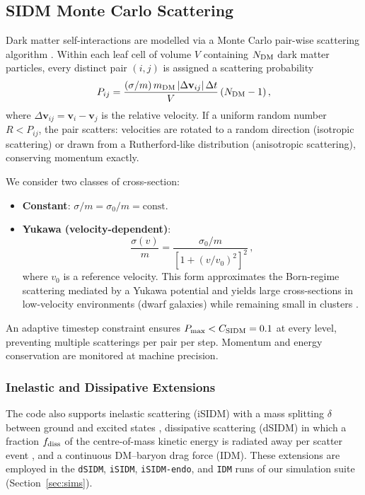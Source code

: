 \documentclass[fleqn,usenatbib]{mnras}
\newcommand{\code}[1]{\texttt{#1}}
\newcommand{\sigmam}{\sigma/m}
\begin{document}
\subsection{SIDM Monte Carlo Scattering}
\label{sec:sidm}

Dark matter self-interactions are modelled via a Monte Carlo pair-wise
scattering algorithm \citep{Robertson2017a}.  Within each leaf cell of
volume $V$ containing $N_{\rm DM}$ dark matter particles, every
distinct pair $(i,j)$ is assigned a scattering probability
\begin{equation}
  P_{ij} = \frac{(\sigmam)\,m_{\rm DM}\,|\Delta\mathbf{v}_{ij}|\,
    \Delta t}{V}\,(N_{\rm DM}-1)\,,
  \label{eq:pscatter}
\end{equation}
where $\Delta\mathbf{v}_{ij} = \mathbf{v}_i - \mathbf{v}_j$ is the
relative velocity.  If a uniform random number $R < P_{ij}$, the pair
scatters: velocities are rotated to a random direction (isotropic
scattering) or drawn from a Rutherford-like distribution (anisotropic
scattering), conserving momentum exactly.

We consider two classes of cross-section:
\begin{itemize}
  \item \textbf{Constant}: $\sigmam = \sigma_0/m = \mathrm{const.}$
  \item \textbf{Yukawa (velocity-dependent)}:
    \begin{equation}
      \frac{\sigma(v)}{m} = \frac{\sigma_0/m}
        {\left[1 + (v/v_0)^2\right]^2}\,,
      \label{eq:yukawa}
    \end{equation}
    where $v_0$ is a reference velocity.  This form approximates the
    Born-regime scattering mediated by a Yukawa potential and yields
    large cross-sections in low-velocity environments (dwarf galaxies)
    while remaining small in clusters \citep{Tulin2013}.
\end{itemize}

An adaptive timestep constraint ensures $P_{\rm max} <
C_{\rm SIDM} = 0.1$ at every level, preventing multiple scatterings
per pair per step.  Momentum and energy conservation are monitored at
machine precision.

\subsubsection{Inelastic and Dissipative Extensions}

The code also supports inelastic scattering (iSIDM) with a mass
splitting $\delta$ between ground and excited states
\citep{Schutz2015}, dissipative scattering (dSIDM) in which a
fraction $f_{\rm diss}$ of the centre-of-mass kinetic energy is
radiated away per scatter event \citep{Shen2021}, and a continuous
DM--baryon drag force (IDM).  These extensions are employed in the
\code{dSIDM}, \code{iSIDM}, \code{iSIDM-endo}, and \code{IDM} runs
of our simulation suite (Section~\ref{sec:sims}).
\end{document}
